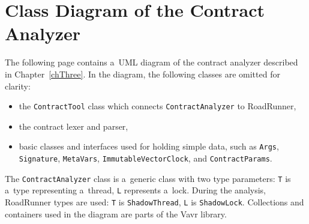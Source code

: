 \chapter{Class Diagram of the Contract Analyzer}
\label{diagram}

The following page contains a~UML diagram of the contract analyzer described in
Chapter~\ref{chThree}. In the diagram, the following classes are omitted for
clarity:
\begin{itemize}
    \item the \texttt{ContractTool} class which connects
    \texttt{ContractAnalyzer} to RoadRunner,
    \item the contract lexer and parser,
    \item basic classes and interfaces used for holding simple data, such as
    \texttt{Args}, \texttt{Signature}, \texttt{MetaVars},
    \texttt{ImmutableVectorClock}, and \texttt{ContractParams}.
\end{itemize}
The \texttt{ContractAnalyzer} class is a~generic class with two type parameters:
\texttt{T} is a~type representing a~thread, \texttt{L} represents a~lock. During
the analysis, RoadRunner types are used: \texttt{T} is \texttt{ShadowThread},
\texttt{L} is \texttt{ShadowLock}. Collections and containers used in the
diagram are parts of the Vavr library.

\pagebreak

